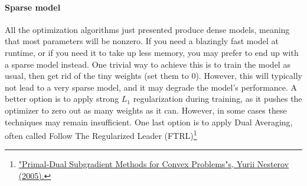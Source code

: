 \documentclass[12pt, letterpaper]{article}
\theoremstyle{definition}
\let\tb\textbf
\begin{document}
\paragraph{\tb{Sparse model}} All the optimization algorithms just presented produce dense models, meaning that most parameters will be nonzero. If you need a blazingly fast model at runtime, or if you need it to take up less memory, you may prefer to end up with a sparse model instead. One trivial way to achieve this is to train the model as usual, then get rid of the tiny weights (set them to 0). However, this will typically not lead to a very sparse model, and it may degrade the model's performance. A better option is to apply strong $L_1$ regularization during training, as it pushes the optimizer to zero out as many weights as it can. However, in some cases these techniques may remain insufficient. One last option is to apply Dual Averaging, often called Follow The Regularized Leader (FTRL)\footnote{\href{However, in some cases these techniques may remain insufficient. One last option is to apply Dual Averaging, often called Follow The Regularized Leader (FTRL)}{"Primal-Dual Subgradient Methods for Convex Problems"s, Yurii Nesterov (2005).}}
\end{document}
